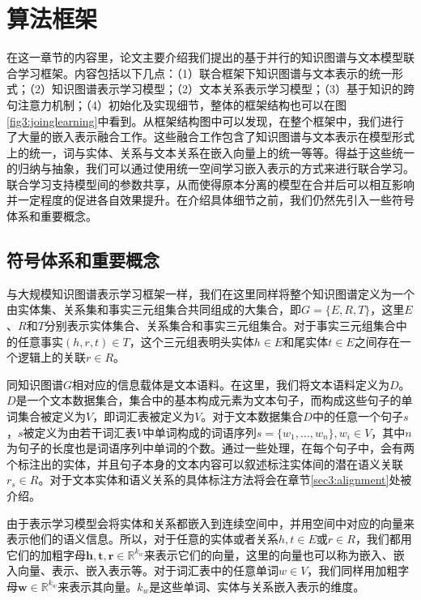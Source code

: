 \section{算法框架}
在这一章节的内容里，论文主要介绍我们提出的基于并行的知识图谱与文本模型联合学习框架。内容包括以下几点：（1）联合框架下知识图谱与文本表示的统一形式；（2）知识图谱表示学习模型；（2）文本关系表示学习模型；（3）基于知识的跨句注意力机制；（4）初始化及实现细节，整体的框架结构也可以在图\ref{fig3:joinglearning}中看到。从框架结构图中可以发现，在整个框架中，我们进行了大量的嵌入表示融合工作。这些融合工作包含了知识图谱与文本表示在模型形式上的统一，词与实体、关系与文本关系在嵌入向量上的统一等等。得益于这些统一的归纳与抽象，我们可以通过使用统一空间学习嵌入表示的方式来进行联合学习。联合学习支持模型间的参数共享，从而使得原本分离的模型在合并后可以相互影响并一定程度的促进各自效果提升。在介绍具体细节之前，我们仍然先引入一些符号体系和重要概念。

\subsection{符号体系和重要概念}

与大规模知识图谱表示学习框架一样，我们在这里同样将整个知识图谱定义为一个由实体集、关系集和事实三元组集合共同组成的大集合，即$G = \{E, R, T\}$，这里$E$、$R$和$T$分别表示实体集合、关系集合和事实三元组集合。对于事实三元组集合中的任意事实$(h, r, t) \in T$，这个三元组表明头实体$h \in E$和尾实体$t \in E$之间存在一个逻辑上的关联$r \in R$。

同知识图谱$G$相对应的信息载体是文本语料。在这里，我们将文本语料定义为$D$。$D$是一个文本数据集合，集合中的基本构成元素为文本句子，而构成这些句子的单词集合被定义为$V$，即词汇表被定义为$V$。对于文本数据集合$D$中的任意一个句子$s$，$s$被定义为由若干词汇表$V$中单词构成的词语序列$s = \{w_1, \ldots, w_n\}, w_i \in V$，其中$n$为句子的长度也是词语序列中单词的个数。通过一些处理，在每个句子中，会有两个标注出的实体，并且句子本身的文本内容可以叙述标注实体间的潜在语义关联$r_s \in R$。对于文本实体和语义关系的具体标注方法将会在章节\ref{sec3:alignment}处被介绍。

由于表示学习模型会将实体和关系都嵌入到连续空间中，并用空间中对应的向量来表示他们的语义信息。所以，对于任意的实体或者关系$h, t \in E$或$r \in R$，我们都用它们的加粗字母$\mathbf{h}, \mathbf{t}, \mathbf{r} \in \mathbb{R}^{k_w}$来表示它们的向量，这里的向量也可以称为嵌入、嵌入向量、表示、嵌入表示等。对于词汇表中的任意单词$w \in V$，我们同样用加粗字母$\mathbf{w}\in \mathbb{R}^{k_w}$来表示其向量。$k_w$是这些单词、实体与关系嵌入表示的维度。

